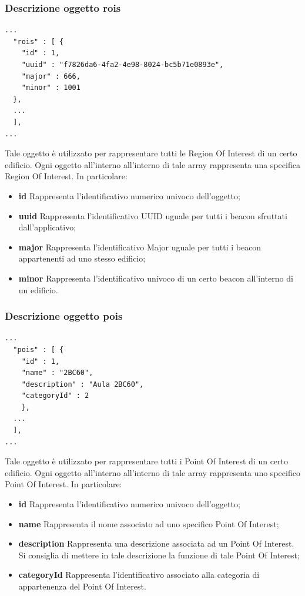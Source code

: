 \documentclass[../ManualeSviluppatore.tex]{subfiles}
\begin{document}
	\subsubsection{Descrizione oggetto rois}
		\begin{lstlisting}
...
  "rois" : [ {
    "id" : 1,
    "uuid" : "f7826da6-4fa2-4e98-8024-bc5b71e0893e",
    "major" : 666,
    "minor" : 1001
  },
  ...
  ],
...
		\end{lstlisting}
		Tale oggetto è utilizzato per rappresentare tutti le Region Of Interest di un certo edificio. Ogni oggetto all'interno all'interno di tale array rappresenta una specifica Region Of Interest. In particolare:
		\begin{itemize}
			\item \textbf{id} Rappresenta l'identificativo numerico univoco dell'oggetto;
			\item \textbf{uuid} Rappresenta l'identificativo UUID uguale per tutti i \gls{beacon} sfruttati dall'applicativo;
			\item \textbf{major} Rappresenta l'identificativo Major uguale per tutti i \gls{beacon} appartenenti ad uno stesso edificio;
			\item \textbf{minor} Rappresenta l'identificativo univoco di un certo \gls{beacon} all'interno di un edificio.
		\end{itemize}
		
	\subsubsection{Descrizione oggetto pois}
		\begin{lstlisting}
...
  "pois" : [ {
	"id" : 1,
	"name" : "2BC60",
	"description" : "Aula 2BC60",
	"categoryId" : 2
    }, 
  ...
  ],
...
		\end{lstlisting}
		Tale oggetto è utilizzato per rappresentare tutti i Point Of Interest di un certo edificio. Ogni oggetto all'interno all'interno di tale array rappresenta uno specifico Point Of Interest. In particolare:
		\begin{itemize}
			\item \textbf{id} Rappresenta l'identificativo numerico univoco dell'oggetto;
			\item \textbf{name} Rappresenta il nome associato ad uno specifico Point Of Interest;
			\item \textbf{description} Rappresenta una descrizione associata ad un Point Of Interest. Si consiglia di mettere in tale descrizione la funzione di tale Point Of Interest;
			\item \textbf{categoryId} Rappresenta l'identificativo associato alla categoria di appartenenza del Point Of Interest.
		\end{itemize}
		
\end{document}
